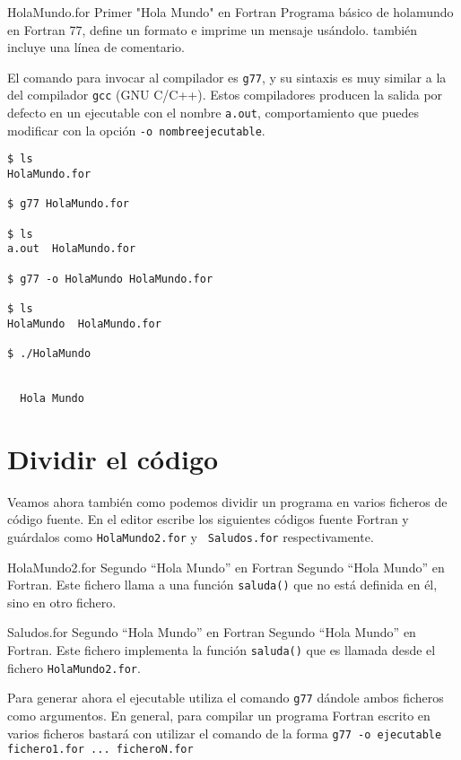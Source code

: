 \begin{ejemplo}%
{HolaMundo.for}%
{Primer "Hola Mundo" en Fortran}
Programa básico de holamundo en Fortran 77, define un formato e imprime 
un mensaje usándolo. también incluye una línea de comentario.
\end{ejemplo}

El comando para  invocar al compilador es {\tt g77},  y su sintaxis es
muy  similar  a  la  del  compilador  {\tt  gcc}  (GNU  C/C++).  Estos
compiladores producen  la salida por  defecto en un ejecutable  con el
nombre {\tt a.out}, comportamiento que  puedes modificar con la opción
{\tt -o nombreejecutable}.

\begin{verbatim}
$ ls
HolaMundo.for

$ g77 HolaMundo.for

$ ls
a.out  HolaMundo.for

$ g77 -o HolaMundo HolaMundo.for

$ ls
HolaMundo  HolaMundo.for

$ ./HolaMundo


  Hola Mundo

\end{verbatim}

\section{Dividir el código}

Veamos  ahora  también como  podemos  dividir  un programa  en  varios
ficheros  de  código  fuente.  En el  editor  escribe  los  siguientes
códigos fuente  Fortran y guárdalos  como {\tt HolaMundo2.for}  y {\tt
Saludos.for} respectivamente.

\begin{ejemplo}%
{HolaMundo2.for}%
{Segundo ``Hola Mundo'' en Fortran}
Segundo ``Hola Mundo'' en Fortran. Este fichero llama a una función
{\tt saluda()} que no está definida en él, sino en otro fichero.
\end{ejemplo}

\begin{ejemplo}%
{Saludos.for}%
{Segundo ``Hola Mundo'' en Fortran}
Segundo ``Hola  Mundo'' en Fortran.  Este fichero implementa  la función
{\tt saluda()} que es llamada desde el fichero {\tt HolaMundo2.for}.
\end{ejemplo}

Para generar ahora el ejecutable  utiliza el comando {\tt g77} dándole
ambos ficheros como argumentos. En  general, para compilar un programa
Fortran escrito en varios ficheros  bastará con utilizar el comando de
la forma {\tt g77 -o ejecutable fichero1.for ... ficheroN.for}

